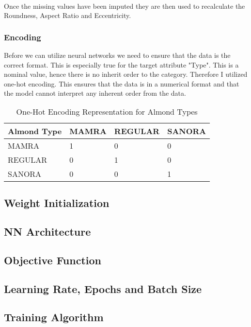 \documentclass[conference]{IEEEtran}
\begin{document}
\newline \\
Once the missing values have been imputed they are then used to recalculate the Roundness, Aspect Ratio and Eccentricity.\\

\subsubsection{Encoding}
Before we can utilize neural networks we need to ensure that the data is the correct format. This is especially true for the target attribute "Type". This is a nominal value, hence there is no inherit order to the category. Therefore I utilized one-hot encoding. This ensures that the data is in a numerical format and that the model cannot interpret any inherent order from the data.
\begin{table}[h]
\centering
\caption{One-Hot Encoding Representation for Almond Types}
\begin{tabular}{|p{1.5cm}|p{1.5cm}|p{1.5cm}|p{1.5cm}|}
\hline
\textbf{Almond Type} & \textbf{MAMRA} & \textbf{REGULAR} & \textbf{SANORA} \\
\hline
MAMRA   & 1 & 0 & 0 \\
REGULAR & 0 & 1 & 0 \\
SANORA  & 0 & 0 & 1 \\
\hline
\end{tabular}
\label{tab:one_hot_representation}
\end{table}

\subsection{Weight Initialization}

\subsection{NN Architecture}

\subsection{Objective Function}

\subsection{Learning Rate, Epochs and Batch Size}

\subsection{Training Algorithm}
\end{document}
